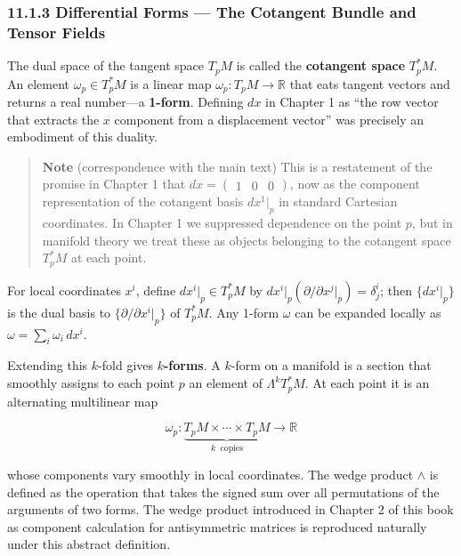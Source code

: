 \hypertarget{differential-forms-the-cotangent-bundle-and-tensor-fields}{%
\subsubsection{11.1.3 Differential Forms --- The Cotangent Bundle and
Tensor
Fields}\label{differential-forms-the-cotangent-bundle-and-tensor-fields}}

The dual space of the tangent space \(T_p M\) is called the
\textbf{cotangent space} \(T_p^* M\). An element
\(\omega_p \in T_p^* M\) is a linear map
\(\omega_p: T_p M \to \mathbb{R}\) that eats tangent vectors and returns
a real number---a \textbf{1-form}. Defining \(dx\) in Chapter 1 as ``the
row vector that extracts the \(x\) component from a displacement
vector'' was precisely an embodiment of this duality.

\begin{quote}
\textbf{Note} (correspondence with the main text) This is a restatement
of the promise in Chapter 1 that
\(dx = \begin{pmatrix}1&0&0\end{pmatrix}\), now as the component
representation of the cotangent basis \(dx^1|_p\) in standard Cartesian
coordinates. In Chapter 1 we suppressed dependence on the point \(p\),
but in manifold theory we treat these as objects belonging to the
cotangent space \(T_p^* M\) at each point.
\end{quote}

For local coordinates \(x^i\), define \(dx^i|_p \in T_p^* M\) by
\(dx^i|_p(\partial/\partial x^j|_p) = \delta^i_j\); then \(\{dx^i|_p\}\)
is the dual basis to \(\{\partial/\partial x^i|_p\}\) of \(T_p^* M\).
Any 1-form \(\omega\) can be expanded locally as
\(\omega = \sum_i \omega_i\,dx^i\).

Extending this \(k\)-fold gives \textbf{\(k\)-forms}. A \(k\)-form on a
manifold is a section that smoothly assigns to each point \(p\) an
element of \(\Lambda^k T_p^* M\). At each point it is an alternating
multilinear map

\[\omega_p: \underbrace{T_p M \times \cdots \times T_p M}_{k\ \text{ copies}} \to \mathbb{R}\]

whose components vary smoothly in local coordinates. The wedge product
\(\wedge\) is defined as the operation that takes the signed sum over
all permutations of the arguments of two forms. The wedge product
introduced in Chapter 2 of this book as component calculation for
antisymmetric matrices is reproduced naturally under this abstract
definition.

